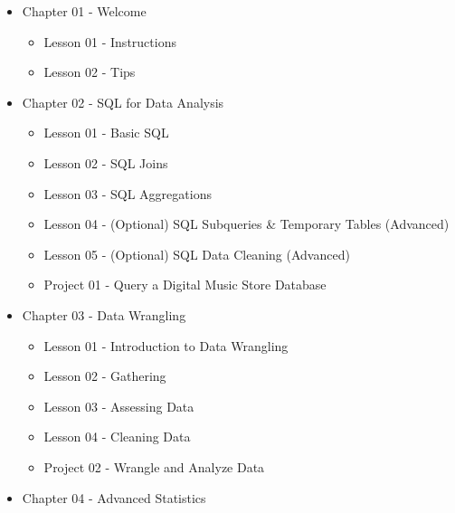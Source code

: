 \documentclass[]{book}
\providecommand{\tightlist}{%
  \setlength{\itemsep}{0pt}\setlength{\parskip}{0pt}}
\begin{document}
\begin{itemize}
\tightlist
\item
  Chapter 01 - Welcome

  \begin{itemize}
  \tightlist
  \item
    Lesson 01 - Instructions
  \item
    Lesson 02 - Tips
  \end{itemize}
\item
  Chapter 02 - SQL for Data Analysis

  \begin{itemize}
  \tightlist
  \item
    Lesson 01 - Basic SQL
  \item
    Lesson 02 - SQL Joins
  \item
    Lesson 03 - SQL Aggregations
  \item
    Lesson 04 - (Optional) SQL Subqueries \& Temporary Tables (Advanced)
  \item
    Lesson 05 - (Optional) SQL Data Cleaning (Advanced)
  \item
    Project 01 - Query a Digital Music Store Database
  \end{itemize}
\item
  Chapter 03 - Data Wrangling

  \begin{itemize}
  \tightlist
  \item
    Lesson 01 - Introduction to Data Wrangling
  \item
    Lesson 02 - Gathering
  \item
    Lesson 03 - Assessing Data
  \item
    Lesson 04 - Cleaning Data
  \item
    Project 02 - Wrangle and Analyze Data
  \end{itemize}
\item
  Chapter 04 - Advanced Statistics


\end{itemize}
\end{document}
